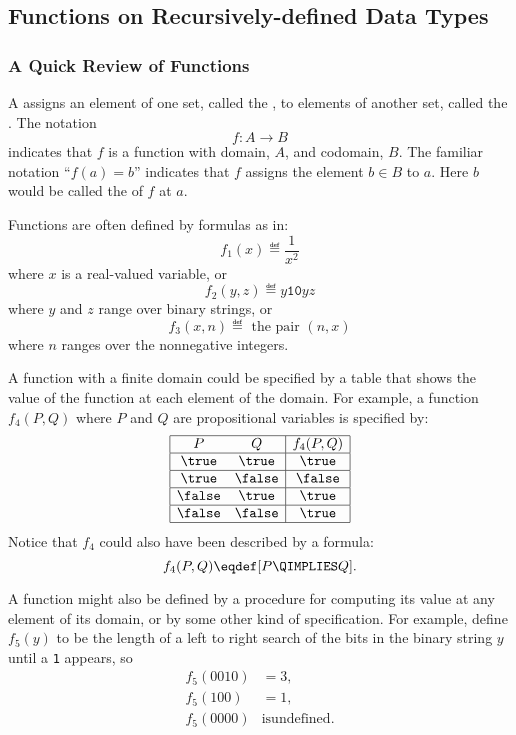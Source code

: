 \subsection{Functions on Recursively-defined Data Types}

\subsubsection{A Quick Review of Functions}\label{funcsubsec}

A  assigns an element of one set, called the
, to elements of another set, called the .
The notation
\[
f: A \to B
\]
indicates that $f$ is a function with domain, $A$, and codomain, $B$.  The
familiar notation ``$f(a) = b$'' indicates that $f$ assigns the element $b
\in B$ to $a$.  Here $b$ would be called the  of $f$ at
 $a$.

Functions are often defined by formulas as in:
\[
f_1(x) \eqdef \frac{1}{x^2}
\]
where $x$ is a real-valued variable, or
\[
f_2(y,z) \eqdef y\mathtt{10}yz
\]
where $y$ and $z$ range over binary strings, or
\[
f_3(x, n) \eqdef \text{ the pair } (n, x)
\]
where $n$ ranges over the nonnegative integers.

A function with a finite domain could be specified by a table that shows
the value of the function at each element of the domain.  For example, a function
$f_4(P,Q)$ where $P$ and $Q$ are propositional variables is specified by:
\[\begin{array}{|cc|c|}
\hline
P & Q & f_4(P,Q)\\
\hline \true & \true & \true\\
\hline \true & \false & \false\\
\hline \false & \true & \true\\
\hline \false & \false & \true\\
\hline
\end{array}\]
Notice that $f_4$ could also have been described by a formula:
\[
f_4(P,Q)  \eqdef [P \QIMPLIES Q].
\]

A function might also be defined by a procedure for computing its value at
any element of its domain, or by some other kind of specification.  For
example, define $f_5(y)$ to be the length of a left to right search of the
bits in the binary string $y$ until a \texttt{1} appears, so
\begin{align*}
f_5(0010) & = 3,\\
f_5(100)  & = 1,\\
f_5(0000) & \text{is} \text{undefined}.
\end{align*}

